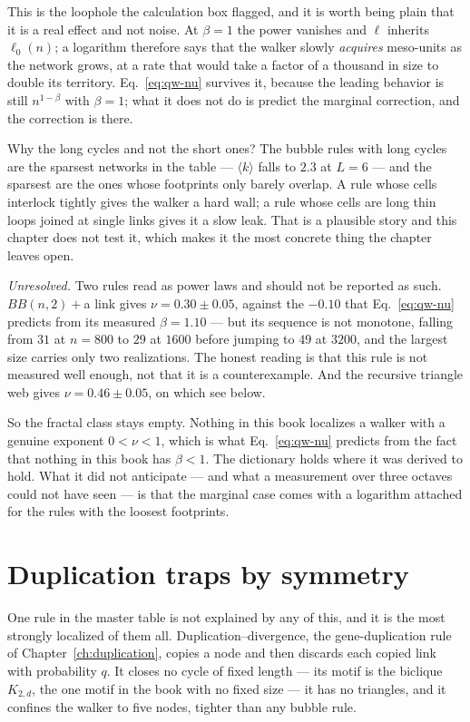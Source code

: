 This is the loophole the calculation box flagged, and it is worth being plain that it
is a real effect and not noise. At $\beta=1$ the power vanishes and $\ell$ inherits
$\ell_0(n)$; a logarithm therefore says that the walker slowly \emph{acquires}
meso-units as the network grows, at a rate that would take a factor of a thousand in
size to double its territory. Eq.~\eqref{eq:qw-nu} survives it, because the leading
behavior is still $n^{1-\beta}$ with $\beta=1$; what it does not do is predict the
marginal correction, and the correction is there.

Why the long cycles and not the short ones? The bubble rules with long cycles are the
sparsest networks in the table --- $\langle k\rangle$ falls to $2.3$ at $L=6$ --- and
the sparsest are the ones whose footprints only barely overlap. A rule whose cells
interlock tightly gives the walker a hard wall; a rule whose cells are long thin loops
joined at single links gives it a slow leak. That is a plausible story and this
chapter does not test it, which makes it the most concrete thing the chapter leaves
open.

\emph{Unresolved.} Two rules read as power laws and should not be reported as such.
$BB(n,2)+$a link gives $\nu=0.30\pm0.05$, against the $-0.10$ that
Eq.~\eqref{eq:qw-nu} predicts from its measured $\beta=1.10$ --- but its sequence is
not monotone, falling from $31$ at $n=800$ to $29$ at $1600$ before jumping to $49$ at
$3200$, and the largest size carries only two realizations. The honest reading is that
this rule is not measured well enough, not that it is a counterexample. And the
recursive triangle web gives $\nu=0.46\pm0.05$, on which see below.

So the fractal class stays empty. Nothing in this book localizes a walker with a
genuine exponent $0<\nu<1$, which is what Eq.~\eqref{eq:qw-nu} predicts from the fact
that nothing in this book has $\beta<1$. The dictionary holds where it was derived to
hold. What it did not anticipate --- and what a measurement over three octaves could
not have seen --- is that the marginal case comes with a logarithm attached for the
rules with the loosest footprints.


\section{Duplication traps by symmetry}
\label{sec:qw-twins}

One rule in the master table is not explained by any of this, and it is the most
strongly localized of them all. Duplication--divergence, the gene-duplication rule
of Chapter~\ref{ch:duplication}, copies a node and then discards each copied link
with probability $q$. It closes no cycle of fixed length --- its motif is the
biclique $K_{2,d}$, the one motif in the book with no fixed size --- it has no
triangles, and it confines the walker to five nodes, tighter than any bubble rule.

